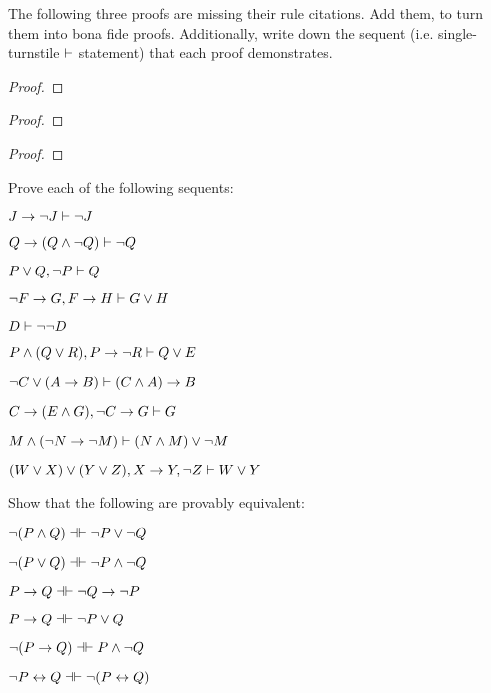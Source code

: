 \practiceproblems
\problempart
The following three proofs are missing their rule citations. Add them, to turn them into bona fide proofs. Additionally, write down the sequent (i.e. single-turnstile $\vdash$ statement) that each proof demonstrates.
\begin{multicols}{2}
\begin{proof}
\end{proof}

\begin{proof}
\open
\close
{}%
\end{proof}

\begin{proof}
\open
\close
\open
\close
{}%
\end{proof}
\end{multicols}

\problempart
Prove each of the following sequents:
\begin{earg}
\item $J\rightarrow\neg J \vdash \neg J$
\item $Q\rightarrow(Q\wedge\neg Q) \vdash \neg Q$
\item $P \vee Q, \neg P \vdash Q$
\item $\neg F\rightarrow G, F\rightarrow H \vdash G\vee H$
\item $D \vdash \neg \neg D$
\item $P \wedge (Q\vee R), P\rightarrow \neg R \vdash Q\vee E$
\item $\neg C \vee (A \rightarrow B) \vdash (C \wedge A) \rightarrow B$
\item $C\rightarrow(E\wedge G), \neg C \rightarrow G \vdash G$
\item $M \wedge (\neg N \rightarrow \neg M) \vdash (N \wedge M) \vee \neg M$
\item $(W \vee X) \vee (Y \vee Z), X\rightarrow Y, \neg Z \vdash W\vee Y$
\end{earg}




\problempart
Show that the following are provably equivalent:
\begin{earg}
\item $\enot (P \eand Q) \pequiv \enot P \eor \enot Q$
\item $\enot (P \eor Q) \pequiv \enot P \eand \enot Q$
\item $P \eif Q \pequiv \enot Q \eif \enot P$
\item $P \eif Q \pequiv \enot P \eor Q$
\item $\enot (P \eif Q) \pequiv P \eand \enot Q$ 
\item $\enot P \eiff Q \pequiv \enot(P \eiff Q)$ 

\end{earg}

